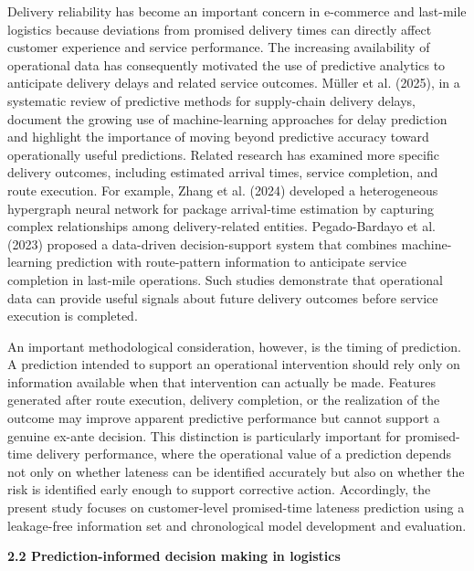 \documentclass[
]{article}
\begin{document}
Delivery reliability has become an important concern in e-commerce and
last-mile logistics because deviations from promised delivery times can
directly affect customer experience and service performance. The
increasing availability of operational data has consequently motivated
the use of predictive analytics to anticipate delivery delays and
related service outcomes. Müller et al. (2025), in a systematic review
of predictive methods for supply-chain delivery delays, document the
growing use of machine-learning approaches for delay prediction and
highlight the importance of moving beyond predictive accuracy toward
operationally useful predictions. Related research has examined more
specific delivery outcomes, including estimated arrival times, service
completion, and route execution. For example, Zhang et al. (2024)
developed a heterogeneous hypergraph neural network for package
arrival-time estimation by capturing complex relationships among
delivery-related entities. Pegado-Bardayo et al. (2023) proposed a
data-driven decision-support system that combines machine-learning
prediction with route-pattern information to anticipate service
completion in last-mile operations. Such studies demonstrate that
operational data can provide useful signals about future delivery
outcomes before service execution is completed.

An important methodological consideration, however, is the timing of
prediction. A prediction intended to support an operational intervention
should rely only on information available when that intervention can
actually be made. Features generated after route execution, delivery
completion, or the realization of the outcome may improve apparent
predictive performance but cannot support a genuine ex-ante decision.
This distinction is particularly important for promised-time delivery
performance, where the operational value of a prediction depends not
only on whether lateness can be identified accurately but also on
whether the risk is identified early enough to support corrective
action. Accordingly, the present study focuses on customer-level
promised-time lateness prediction using a leakage-free information set
and chronological model development and evaluation.

\textbf{2.2 Prediction-informed decision making in logistics}
\end{document}
